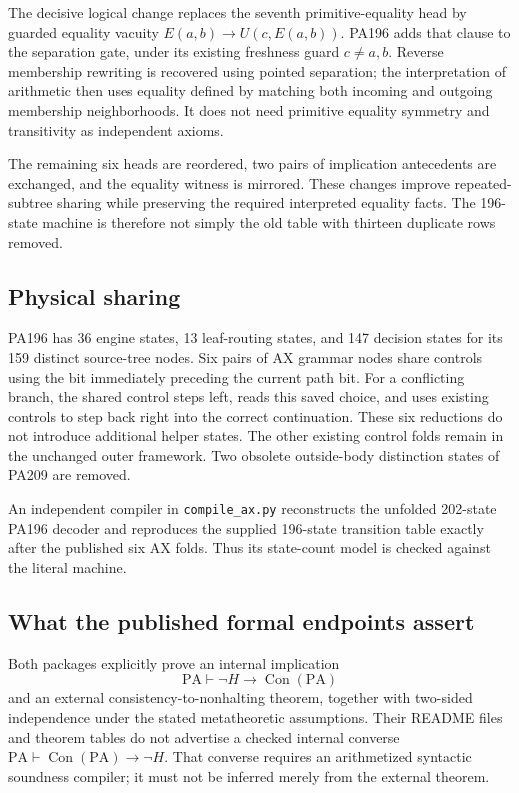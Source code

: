 The decisive logical change replaces the seventh primitive-equality
head by guarded equality vacuity
$E(a,b)\to U(c,E(a,b))$. PA196 adds that clause to the separation gate,
under its existing freshness guard $c\ne a,b$. Reverse membership
rewriting is recovered using pointed separation; the interpretation of
arithmetic then uses equality defined by matching both incoming and
outgoing membership neighborhoods. It does not need primitive equality
symmetry and transitivity as independent axioms.

The remaining six heads are reordered, two pairs of implication
antecedents are exchanged, and the equality witness is mirrored.
These changes improve repeated-subtree sharing while preserving the
required interpreted equality facts. The 196-state machine is therefore
not simply the old table with thirteen duplicate rows removed.

\subsection{Physical sharing}

PA196 has 36 engine states, 13 leaf-routing states, and 147 decision
states for its 159 distinct source-tree nodes. Six pairs of AX grammar
nodes share controls using the bit immediately preceding the current
path bit. For a conflicting branch, the shared control steps left,
reads this saved choice, and uses existing controls to step back right
into the correct continuation. These six reductions do not introduce
additional helper states. The other existing control folds remain in
the unchanged outer framework. Two obsolete outside-body distinction
states of PA209 are removed.

An independent compiler in \texttt{compile\_ax.py} reconstructs the
unfolded 202-state PA196 decoder and reproduces the supplied 196-state
transition table exactly after the published six AX folds. Thus its
state-count model is checked against the literal machine.

\subsection{What the published formal endpoints assert}

Both packages explicitly prove an internal implication
\[
  \mathrm{PA}\vdash\neg H\to\operatorname{Con}(\mathrm{PA})
\]
and an external consistency-to-nonhalting theorem, together with
two-sided independence under the stated metatheoretic assumptions.
Their README files and theorem tables do not advertise a checked
internal converse
$\mathrm{PA}\vdash\operatorname{Con}(\mathrm{PA})\to\neg H$.
That converse requires an arithmetized syntactic soundness compiler;
it must not be inferred merely from the external theorem.

